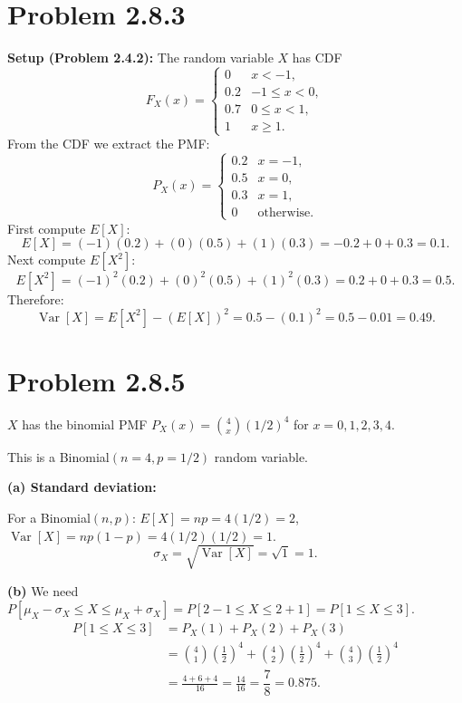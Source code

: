 \documentclass[11pt]{article}
\newcommand{\Var}{\operatorname{Var}}
\begin{document}
\section*{Problem 2.8.3}

\textbf{Setup (Problem 2.4.2):} The random variable $X$ has CDF
\[
F_X(x)=\begin{cases}0 & x<-1,\\0.2 & -1\le x<0,\\0.7 & 0\le x<1,\\1 & x\ge 1.\end{cases}
\]
From the CDF we extract the PMF:
\[
P_X(x)=\begin{cases}0.2 & x=-1,\\0.5 & x=0,\\0.3 & x=1,\\0 & \text{otherwise.}\end{cases}
\]
First compute $E[X]$:
\[
E[X] = (-1)(0.2)+(0)(0.5)+(1)(0.3) = -0.2+0+0.3 = 0.1.
\]
Next compute $E[X^2]$:
\[
E[X^2] = (-1)^2(0.2)+(0)^2(0.5)+(1)^2(0.3) = 0.2+0+0.3 = 0.5.
\]
Therefore:
\[
\Var[X] = E[X^2]-(E[X])^2 = 0.5 - (0.1)^2 = 0.5 - 0.01 = \boxed{0.49}.
\]

\section*{Problem 2.8.5}

$X$ has the binomial PMF $P_X(x)=\binom{4}{x}(1/2)^4$ for $x=0,1,2,3,4$.

This is a Binomial$(n=4, p=1/2)$ random variable.

\textbf{(a) Standard deviation:}

For a Binomial$(n,p)$: $E[X]=np=4(1/2)=2$, $\Var[X]=np(1-p)=4(1/2)(1/2)=1$.
\[
\sigma_X = \sqrt{\Var[X]} = \sqrt{1} = \boxed{1}.
\]

\textbf{(b)} We need $P[\mu_X - \sigma_X \le X \le \mu_X + \sigma_X] = P[2-1 \le X \le 2+1] = P[1\le X\le 3]$.
\begin{align*}
P[1\le X\le 3] &= P_X(1)+P_X(2)+P_X(3)\\
&= \binom{4}{1}\!\left(\tfrac{1}{2}\right)^4 + \binom{4}{2}\!\left(\tfrac{1}{2}\right)^4 + \binom{4}{3}\!\left(\tfrac{1}{2}\right)^4\\
&= \frac{4+6+4}{16} = \frac{14}{16} = \boxed{\dfrac{7}{8} = 0.875}.
\end{align*}
\end{document}
